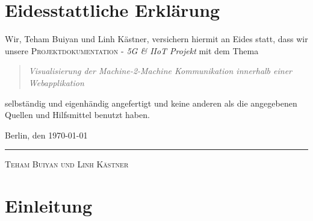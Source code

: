 \documentclass[
	12pt,								%
	DIV10,
	a4paper,         		%
	oneside,						%
	parskip=half,				%
	headings=normal,			%
	listof=totoc,					%
	bibliography=totoc,						%
	index=totoc,						%
	final								%
]{scrartcl}
\newcommand{\nameOfTitel}{Projektdokumentation}
\newcommand{\untertitel}{5G \& IIoT Projekt}	%
\newcommand{\art}{Visualisierung der Machine-2-Machine Kommunikation innerhalb einer Webapplikation}
\newcommand{\autor}{Teham Buiyan und Linh Kästner}
\newcommand{\datum}{\today}				%
\begin{document}
\section*{Eidesstattliche Erklärung}
Wir, \autor, versichern hiermit an Eides statt, dass wir unsere \textsc{\nameOfTitel} - \textit{\untertitel} mit dem Thema
\begin{quote}
\textit{\art}  
\end{quote}
selbständig und eigenhändig angefertigt und keine anderen als die angegebenen Quellen und Hilfsmittel benutzt haben.

\bigskip
\bigskip
\bigskip

Berlin, den \datum


\rule[-0.2cm]{5cm}{0.5pt}

\textsc{\autor} 

\newpage
\pagestyle{fancy}
\fancyhf{}
\fancyhead[L]{\leftmark}
\fancyfoot[C]{\thepage}
\setlength{\headheight}{8pt}
\renewcommand{\headrulewidth}{0.4pt}
\renewcommand{\footrulewidth}{0.4pt}


\tableofcontents %
\newpage
{}



\section{Einleitung}
\end{document}
